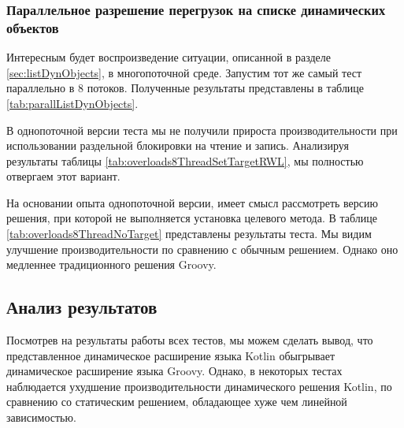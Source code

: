\subsubsection{Параллельное разрешение перегрузок на списке динамических объектов}

Интересным будет воспроизведение ситуации, описанной в разделе \ref{sec:listDynObjects}, в многопоточной среде. Запустим тот же самый тест параллельно в 8 потоков. Полученные результаты представлены в таблице \ref{tab:parallListDynObjects}.

В однопоточной версии теста мы не получили прироста производительности при использовании раздельной блокировки на чтение и запись. Анализируя результаты таблицы \ref{tab:overloads8ThreadSetTargetRWL}, мы полностью отвергаем этот вариант.

На основании опыта однопоточной версии, имеет смысл рассмотреть версию решения, при которой не выполняется установка целевого метода. В таблице \ref{tab:overloads8ThreadNoTarget} представлены результаты теста. Мы видим улучшение производительности по сравнению с обычным решением. Однако оно медленнее традиционного решения Groovy.

\subsection{Анализ результатов}

Посмотрев на результаты работы всех тестов, мы можем сделать вывод, что представленное динамическое расширение языка Kotlin обыгрывает динамическое расширение языка Groovy. Однако, в некоторых тестах наблюдается ухудшение производительности динамического решения Kotlin, по сравнению со статическим решением, обладающее хуже чем линейной зависимостью. 